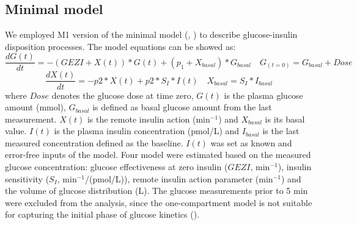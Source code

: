 \documentclass[utf8]{frontiersSCNS} %
\begin{document}
\subsection{Minimal model}
We employed M1 version of the minimal model (\cite{Bergman1979}, \cite{Araujo-vilar1998}) to describe glucose-insulin disposition processes. The model equations can be showed as:
\begin{equation}
\frac{dG(t)}{dt} =-(GEZI+X(t))*G(t)+(p_1+X_{basal})*G_{basal} \quad G_{(t=0)} =G_{basal}+Dose\label{eq:01}
\end{equation}
\begin{equation}
\frac{dX(t)}{dt} =-p2*X(t)+p2*S_I*I(t) \quad X_{basal} =S_I*I_{basal}\label{eq:02}
\end{equation}
where $Dose$ denotes the glucose dose at time zero, $G(t)$ is the plasma glucose amount (mmol), $G_{basal}$ is defined as basal glucose amount from the last measurement. $X(t)$ is the remote insulin action (min$^{-1}$) and $X_{basal}$ is its basal value. $I(t)$ is the plasma insulin concentration (pmol/L) and $I_{basal}$ is the last measured concentration defined as the baseline. $I(t)$ was set as known and error-free inputs of the model. Four model were estimated based on the measured glucose concentration: glucose effectiveness at zero insulin ($GEZI$, min$^{-1}$), insulin sensitivity ($S_I$, min$^{-1}$/(pmol/L)), remote insulin action parameter (min$^{-1}$) and the volume of glucose distribution (L). The glucose measurements prior to 5 min were excluded from the analysis, since the one-compartment model is not suitable for capturing the initial phase of glucose kinetics (\cite{Vicini1999}).
\end{document}
